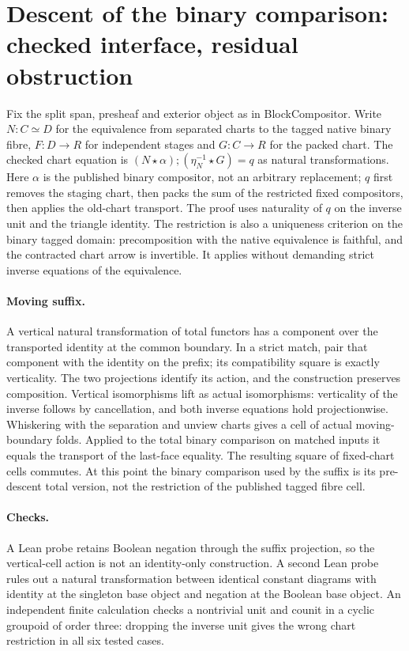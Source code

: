 \documentclass{article}
\begin{document}
\section*{Descent of the binary comparison: checked interface, residual obstruction}
Fix the split span, presheaf and exterior object as in BlockCompositor. Write
$N:C\simeq D$ for the equivalence from separated charts to the tagged native
binary fibre, $F:D\to R$ for independent stages and $G:C\to R$ for the
packed chart. The checked chart equation is
$(N\star\alpha);(\eta_N^{-1}\star G)=q$ as natural transformations.
Here $\alpha$ is the published binary compositor, not an arbitrary replacement;
$q$ first removes the staging chart, then packs the sum of the restricted
fixed compositors, then applies the old-chart transport. The proof uses
naturality of $q$ on the inverse unit and the triangle identity. The restriction is also a uniqueness criterion on the binary tagged domain: precomposition with the native equivalence is faithful, and the contracted chart arrow is invertible. It applies
without demanding strict inverse equations of the equivalence.
\paragraph{Moving suffix.} A vertical natural transformation of total functors has a component over the transported identity at the common boundary. In a strict match, pair that component with the identity on the prefix; its compatibility square is exactly verticality. The two projections identify its action, and the construction preserves composition. Vertical isomorphisms lift as actual isomorphisms: verticality of the inverse follows by cancellation, and both inverse equations hold projectionwise. Whiskering with the separation and unview charts gives a cell of actual moving-boundary folds. Applied to the total binary comparison on matched inputs it equals the transport of the last-face equality. The resulting square of fixed-chart cells commutes. At this point the binary comparison used by the suffix is its pre-descent total version, not the restriction of the published tagged fibre cell.
\paragraph{Checks.} A Lean probe retains Boolean negation through the suffix projection, so the vertical-cell action is not an identity-only construction. A second Lean probe rules out a natural transformation between identical constant diagrams with identity at the singleton base object and negation at the Boolean base object. An independent finite calculation checks a nontrivial unit and counit in a cyclic groupoid of order three: dropping the inverse unit gives the wrong chart restriction in all six tested cases.
\end{document}
